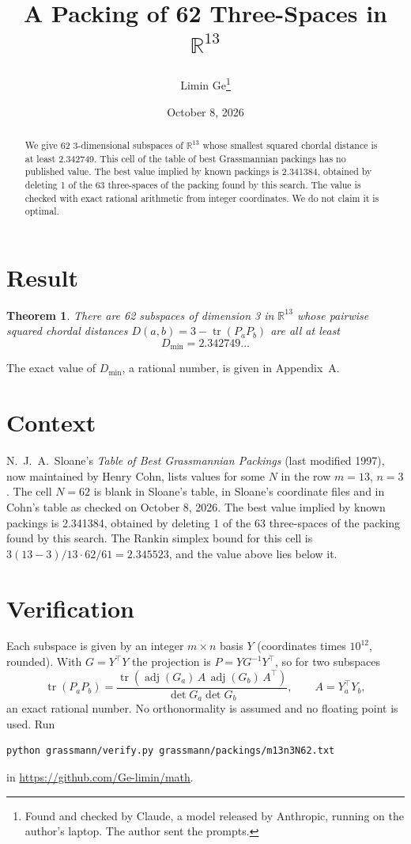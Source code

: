 \documentclass[11pt,a4paper]{article}
\title{A Packing of 62 Three-Spaces in $\mathbb{R}^{13}$}
\author{Limin Ge\thanks{Found and checked by Claude, a model released by Anthropic, running on the author's laptop. The author sent the prompts.}}
\date{October 8, 2026}
\newtheorem*{theorem}{Theorem}
\begin{document}
\maketitle
\begin{abstract}
We give 62 3-dimensional subspaces of $\mathbb{R}^{13}$ whose smallest squared chordal distance is at least 2.342749. This cell of the table of best Grassmannian packings has no published value. The best value implied by known packings is 2.341384, obtained by deleting 1 of the 63 three-spaces of the packing found by this search. The value is checked with exact rational arithmetic from integer coordinates. We do not claim it is optimal.
\end{abstract}

\section{Result}
\begin{theorem}
There are 62 subspaces of dimension 3 in $\mathbb{R}^{13}$ whose pairwise squared chordal distances $D(a,b) = 3 - \operatorname{tr}(P_aP_b)$ are all at least
\[ D_{\min} = 2.342749\ldots \]
\end{theorem}
The exact value of $D_{\min}$, a rational number, is given in Appendix~A.


\section{Context}
N.~J.~A.~Sloane's \emph{Table of Best Grassmannian Packings} (last modified 1997), now maintained by Henry Cohn, lists values for some $N$ in the row $m=13$, $n=3$. The cell $N=62$ is blank in Sloane's table, in Sloane's coordinate files and in Cohn's table as checked on October 8, 2026. The best value implied by known packings is 2.341384, obtained by deleting 1 of the 63 three-spaces of the packing found by this search. The Rankin simplex bound for this cell is $3(13-3)/13\cdot 62/61 = 2.345523$, and the value above lies below it.


\section{Verification}
Each subspace is given by an integer $m\times n$ basis $Y$ (coordinates times $10^{12}$, rounded). With $G=Y^\top Y$ the projection is $P=YG^{-1}Y^\top$, so for two subspaces
\[ \operatorname{tr}(P_aP_b)=\frac{\operatorname{tr}(\operatorname{adj}(G_a)\,A\,\operatorname{adj}(G_b)\,A^\top)}{\det G_a\det G_b},\qquad A=Y_a^\top Y_b, \]
an exact rational number. No orthonormality is assumed and no floating point is used. Run
\begin{verbatim}
python grassmann/verify.py grassmann/packings/m13n3N62.txt
\end{verbatim}
in \url{https://github.com/Ge-limin/math}.
\end{document}
